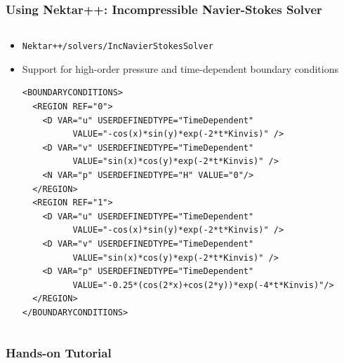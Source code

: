 \documentclass{beamer}
\numberwithin{figure}{section}
\numberwithin{equation}{section}
\begin{document}
\begin{frame}[fragile]
\frametitle{Using Nektar++: Incompressible Navier-Stokes Solver}
\begin{minipage}[c][0.8\textheight][t]{\linewidth}
\begin{columns}
\begin{column}[l]{11.5cm}
\begin{itemize}
  \item \texttt{Nektar++/solvers/IncNavierStokesSolver}
  \item Support for high-order pressure and time-dependent boundary conditions
  \begin{lstlisting}
<BOUNDARYCONDITIONS>
  <REGION REF="0">
    <D VAR="u" USERDEFINEDTYPE="TimeDependent" 
          VALUE="-cos(x)*sin(y)*exp(-2*t*Kinvis)" />
    <D VAR="v" USERDEFINEDTYPE="TimeDependent" 
          VALUE="sin(x)*cos(y)*exp(-2*t*Kinvis)" />
    <N VAR="p" USERDEFINEDTYPE="H" VALUE="0"/>
  </REGION>
  <REGION REF="1">
    <D VAR="u" USERDEFINEDTYPE="TimeDependent" 
          VALUE="-cos(x)*sin(y)*exp(-2*t*Kinvis)" />
    <D VAR="v" USERDEFINEDTYPE="TimeDependent" 
          VALUE="sin(x)*cos(y)*exp(-2*t*Kinvis)" />
    <D VAR="p" USERDEFINEDTYPE="TimeDependent" 
          VALUE="-0.25*(cos(2*x)+cos(2*y))*exp(-4*t*Kinvis)"/>
  </REGION>
</BOUNDARYCONDITIONS>
  \end{lstlisting}
\end{itemize}
\end{column}
\end{columns}
\end{minipage}
\end{frame}

\begin{frame}[fragile]
\frametitle{Hands-on Tutorial}
\begin{minipage}[c][0.8\textheight][t]{\linewidth}
\begin{columns}
\begin{column}[l]{11.5cm}

\end{column}
\end{columns}
\end{minipage}
\end{frame}
\end{document}
